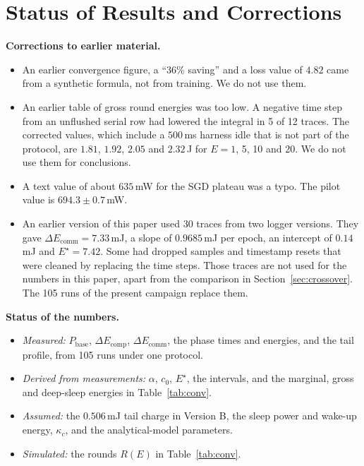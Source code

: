 \documentclass[journal]{IEEEtran}
\newcommand{\Pbase}{P_{\mathrm{base}}}
\newcommand{\Estar}{E^{\star}}
\begin{document}
\section{Status of Results and Corrections}
\textbf{Corrections to earlier material.}
\begin{itemize}
\item An earlier convergence figure, a ``36\% saving'' and a loss value of $4.82$ came from a synthetic formula, not from training. We do not use them.
\item An earlier table of gross round energies was too low. A negative time step from an unflushed serial row had lowered the integral in 5 of 12 traces. The corrected values, which include a $500$\,ms harness idle that is not part of the protocol, are $1.81$, $1.92$, $2.05$ and $2.32$\,J for $E=1$, 5, 10 and 20. We do not use them for conclusions.
\item A text value of about $635$\,mW for the SGD plateau was a typo. The pilot value is $694.3\pm0.7$\,mW.
\item An earlier version of this paper used 30 traces from two logger versions. They gave $\Delta E_{\mathrm{comm}}=7.33$\,mJ, a slope of $0.9685$\,mJ per epoch, an intercept of $0.14$\,mJ and $\Estar=7.42$. Some had dropped samples and timestamp resets that were cleaned by replacing the time steps. Those traces are not used for the numbers in this paper, apart from the comparison in Section~\ref{sec:crossover}. The 105 runs of the present campaign replace them.
\end{itemize}
\textbf{Status of the numbers.}
\begin{itemize}
\item \emph{Measured:} $\Pbase$, $\Delta E_{\mathrm{comp}}$, $\Delta E_{\mathrm{comm}}$, the phase times and energies, and the tail profile, from 105 runs under one protocol.
\item \emph{Derived from measurements:} $\alpha$, $c_0$, $\Estar$, the intervals, and the marginal, gross and deep-sleep energies in Table~\ref{tab:conv}.
\item \emph{Assumed:} the $0.506$\,mJ tail charge in Version B, the sleep power and wake-up energy, $\kappa_c$, and the analytical-model parameters.
\item \emph{Simulated:} the rounds $R(E)$ in Table~\ref{tab:conv}.
\end{itemize}



\end{document}
